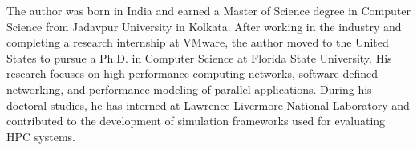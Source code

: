 \documentclass[11pt,expanded,copyright]{fsuthesis}
\begin{document}
\printbibliography





%

\begin{biosketch}
The author was born in India and earned a Master of Science degree in Computer Science from Jadavpur University in Kolkata. After working in the industry and completing a research internship at VMware, the author moved to the United States to pursue a Ph.D. in Computer Science at Florida State University. His research focuses on high-performance computing networks, software-defined networking, and performance modeling of parallel applications. During his doctoral studies, he has interned at Lawrence Livermore National Laboratory and contributed to the development of simulation frameworks used for evaluating HPC systems.
\end{biosketch}

\end{document}
